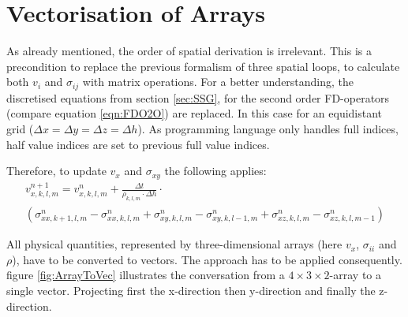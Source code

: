 \documentclass[pdftex,a4paper,parskip,listof=totoc,bibliography=totoc,onehalfspacing,12pt]{scrreprt}
\begin{document}
\section{Vectorisation of Arrays}
As already mentioned, the order of spatial derivation is irrelevant. This is a precondition to replace the previous formalism of three spatial loops, to calculate both $v_i$ and $\sigma_{ij}$ with matrix operations. For a better understanding, the discretised equations from section \ref{sec:SSG}, for the second order FD-operators (compare equation \ref{eqn:FDO2O}) are replaced. In this case for an equidistant grid ($\Delta x = \Delta y = \Delta z = \Delta h$). As programming language only handles full indices, half value indices are set to previous full value indices. 

Therefore, to update $v_x$ and $\sigma_{xy}$  the following applies:
\begin{multline}
	v_{x,k,l,m}^{n+1} = v_{x,k,l,m}^n + \frac{\Delta t}{\rho_{k,l,m} \cdot \Delta h} \cdot\\  \left( \sigma_{xx,k+1,l,m}^{n} - \sigma_{xx,k,l,m}^{n} + \sigma_{xy,k,l,m}^{n} - \sigma_{xy,k,l-1,m}^{n} + \sigma_{xz,k,l,m}^{n} - \sigma_{xz,k,l,m-1}^{n} \right)\label{eqn:exMV1}
\end{multline}

All physical quantities, represented by three-dimensional arrays (here $v_x$, $\sigma_{ii}$ and $\rho$), have to be converted to vectors. The approach has to be applied consequently. figure \ref{fig:ArrayToVec} illustrates the conversation from a $4 \times 3 \times 2$-array to a single vector. Projecting first the x-direction then y-direction and finally the z-direction.
\end{document}

